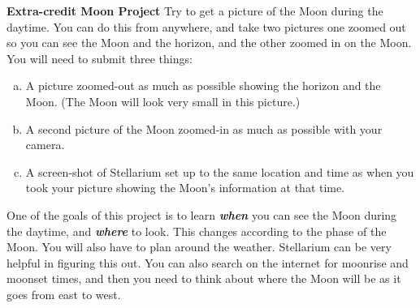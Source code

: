 \documentclass[main.tex]{subfiles}
\begin{document}
\textbf{Extra-credit Moon Project}
\newline
Try to get a picture of the Moon during the daytime. You can do this from anywhere, and take two pictures one zoomed out so you can see the Moon and the horizon, and the other zoomed in on the Moon. You will need to submit three things:
\begin{enumerate} [a.]
    \item A picture zoomed-out as much as possible showing the horizon and the Moon. (The Moon will look very small in this picture.)
    \item A second picture of the Moon zoomed-in as much as possible with your camera. 
    \item A screen-shot of Stellarium set up to the same location and time as when you took your picture showing the Moon's information at that time.
\end{enumerate}
One of the goals of this project is to learn \textit{\textbf{when}} you can see the Moon during the daytime, and \textbf{\textit{where}} to look. This changes according to the phase of the Moon. You will also have to plan around the weather. Stellarium can be very helpful in figuring this out. You can also search on the internet for moonrise and moonset times, and then you need to think about where the Moon will be as it goes from east to west.  
\end{document}
